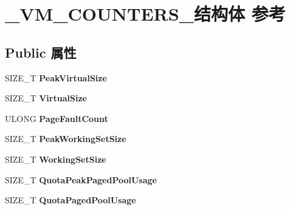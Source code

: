 \hypertarget{struct___v_m___c_o_u_n_t_e_r_s__}{}\section{\+\_\+\+V\+M\+\_\+\+C\+O\+U\+N\+T\+E\+R\+S\+\_\+结构体 参考}
\label{struct___v_m___c_o_u_n_t_e_r_s__}
\subsection*{Public 属性}
\begin{DoxyCompactItemize}
\item 
\mbox{\label{struct___v_m___c_o_u_n_t_e_r_s___a9d0ca7da0f99f88cefb6d7e7d007fe53}} 
S\+I\+Z\+E\+\_\+T {\bfseries Peak\+Virtual\+Size}
\item 
\mbox{\label{struct___v_m___c_o_u_n_t_e_r_s___a34324db948832e553b067863281589e6}} 
S\+I\+Z\+E\+\_\+T {\bfseries Virtual\+Size}
\item 
\mbox{\label{struct___v_m___c_o_u_n_t_e_r_s___afedb28554de68cb7520721811aeba535}} 
U\+L\+O\+NG {\bfseries Page\+Fault\+Count}
\item 
\mbox{\label{struct___v_m___c_o_u_n_t_e_r_s___a1efbbe7e3d022d16937d697c436c491b}} 
S\+I\+Z\+E\+\_\+T {\bfseries Peak\+Working\+Set\+Size}
\item 
\mbox{\label{struct___v_m___c_o_u_n_t_e_r_s___adb728e10f42fc9acb4fa95803f86022c}} 
S\+I\+Z\+E\+\_\+T {\bfseries Working\+Set\+Size}
\item 
\mbox{\label{struct___v_m___c_o_u_n_t_e_r_s___a10698c33d0839786008de277ef627611}} 
S\+I\+Z\+E\+\_\+T {\bfseries Quota\+Peak\+Paged\+Pool\+Usage}
\item 
\mbox{\label{struct___v_m___c_o_u_n_t_e_r_s___abc4c9511bcf42d751489143f908eaacb}} 
S\+I\+Z\+E\+\_\+T {\bfseries Quota\+Paged\+Pool\+Usage}
\item 
\mbox{\label{struct___v_m___c_o_u_n_t_e_r_s___a2e24fa8db78d8606628a36dcdf5720e4}} 

\end{DoxyCompactItemize}
